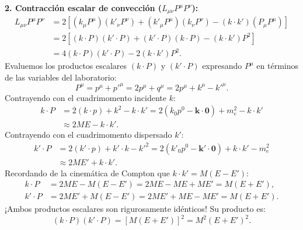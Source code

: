 \documentclass[10pt,a4paper]{article}
\begin{document}
\textbf{2. Contracción escalar de convección ($L_{\mu\nu} P^\mu P^\nu$):}
\begin{align}
L_{\mu\nu} P^\mu P^\nu &= 2 \left[ (k_\mu P^\mu)(k'_\nu P^\nu) + (k'_\mu P^\mu)(k_\nu P^\nu) - (k \cdot k')(P_\mu P^\mu) \right] \nonumber \\
&= 2 \left[ (k \cdot P)(k' \cdot P) + (k' \cdot P)(k \cdot P) - (k \cdot k') P^2 \right] \nonumber \\
&= 4 (k \cdot P)(k' \cdot P) - 2 (k \cdot k') P^2.
\label{eq:L_dot_PP_start}
\end{align}
Evaluemos los productos escalares $(k \cdot P)$ y $(k' \cdot P)$ expresando $P^\mu$ en términos de las variables del laboratorio:
\begin{equation}
P^\mu = p^\mu + p'^\mu = 2 p^\mu + q^\mu = 2 p^\mu + k^\mu - k'^\mu.
\end{equation}
Contrayendo con el cuadrimomento incidente $k$:
\begin{align}
k \cdot P &= 2 (k \cdot p) + k^2 - k \cdot k' = 2 (k_0 p^0 - \mathbf{k} \cdot \mathbf{0}) + m_e^2 - k \cdot k' \nonumber \\
&\approx 2 M E - k \cdot k'.
\end{align}
Contrayendo con el cuadrimomento dispersado $k'$:
\begin{align}
k' \cdot P &= 2 (k' \cdot p) + k' \cdot k - k'^2 = 2 (k'_0 p^0 - \mathbf{k}' \cdot \mathbf{0}) + k \cdot k' - m_e^2 \nonumber \\
&\approx 2 M E' + k \cdot k'.
\end{align}
Recordando de la cinemática de Compton que $k \cdot k' = M (E - E')$:
\begin{align}
k \cdot P &= 2 M E - M (E - E') = 2 M E - M E + M E' = M (E + E'), \\
k' \cdot P &= 2 M E' + M (E - E') = 2 M E' + M E - M E' = M (E + E').
\end{align}
¡Ambos productos escalares son rigurosamente idénticos! Su producto es:
\begin{equation}
(k \cdot P)(k' \cdot P) = [M (E + E')]^2 = M^2 (E + E')^2.
\end{equation}
\end{document}
